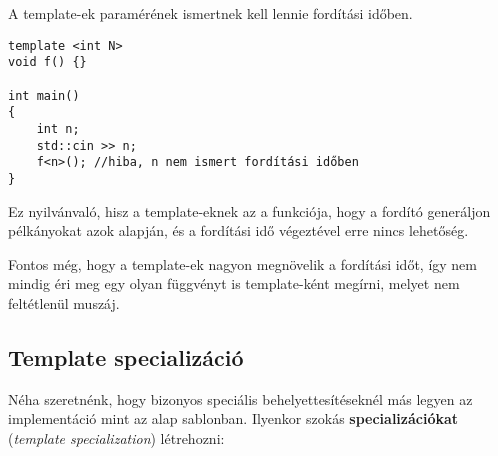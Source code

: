 \documentclass[a4paper,11.5pt,table]{article}
\begin{document}
	A template-ek paramérének ismertnek kell lennie fordítási időben.
	\begin{lstlisting}
template <int N>
void f() {}

int main()
{
	int n;
	std::cin >> n;
	f<n>(); //hiba, n nem ismert fordítási időben
}
	\end{lstlisting}
	Ez nyilvánvaló, hisz a template-eknek az a funkciója, hogy a fordító generáljon pélkányokat azok alapján, és a fordítási idő végeztével erre nincs lehetőség.
	
	\medskip
	Fontos még, hogy a template-ek nagyon megnövelik a fordítási időt, így nem mindig éri meg egy olyan függvényt is template-ként megírni, melyet nem feltétlenül muszáj.
	\subsection{Template specializáció}
	Néha szeretnénk, hogy bizonyos speciális behelyettesítéseknél más legyen az implementáció mint az alap sablonban. Ilyenkor szokás \textbf{specializációkat} (\textit{template specialization}) létrehozni:
	
\end{document}
